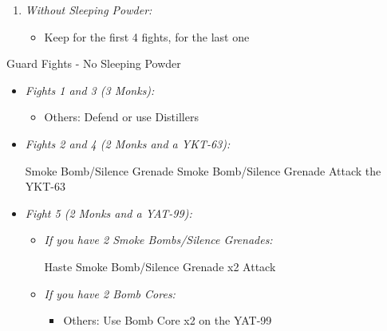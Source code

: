 \begin{enumerate}[resume]
    \item \textit{Without Sleeping Powder:}
    \begin{itemize}
        \item Keep \formation{\tidus}{\rikku}{\lulu} for the first 4 fights, \formation{\tidus}{\rikku}{\kimahri} for the last one
    \end{itemize}
\end{enumerate}
\begin{battle}{Guard Fights - No Sleeping Powder}
    \begin{itemize}
        \item \textit{Fights 1 and 3 (3 Monks):}
        \begin{itemize}
            \tidusf Attack
            \item Others: Defend or use Distillers
        \end{itemize}
        \item \textit{Fights 2 and 4 (2 Monks and a YKT-63):}
        \begin{itemize}
            \switch{\tidus}{\kimahri}
            \kimahrif Smoke Bomb/Silence Grenade
            \rikkuf Smoke Bomb/Silence Grenade
            \switch{\kimahri}{\tidus}
            \tidusf Attack the YKT-63
        \end{itemize}
        \item \textit{Fight 5 (2 Monks and a YAT-99):}
        \begin{itemize}
            \item \textit{If you have 2 Smoke Bombs/Silence Grenades:}
            \begin{itemize}
                \tidusf Haste \rikku
                \rikkuf Smoke Bomb/Silence Grenade x2
                \tidusf Attack
            \end{itemize}
            \item \textit{If you have 2 Bomb Cores:}
            \begin{itemize}
                \tidusf Attack the Monks
                \item Others: Use Bomb Core x2 on the YAT-99
            \end{itemize}
        \end{itemize}
    \end{itemize}
\end{battle}
